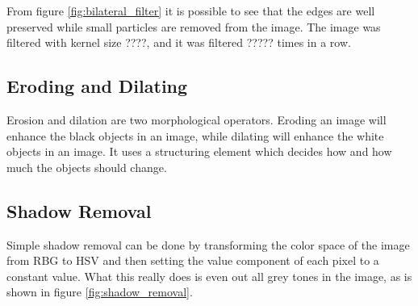 From figure \ref{fig:bilateral_filter} it is possible to see that the edges are well preserved while small particles are removed from the image. The image was filtered with kernel size {\color{red}????}, and it was filtered {\color{red}?????} times in a row.


\subsection{Eroding and Dilating}
Erosion and dilation are two morphological operators. Eroding an image will enhance the black objects in an image, while dilating will enhance the white objects in an image. It uses a structuring element which decides how and how much the objects should change. 


\subsection{Shadow Removal}
Simple shadow removal can be done by transforming the color space of the image from RBG to HSV and then setting the value component of each pixel to a constant value. What this really does is even out all grey tones in the image, as is shown in figure \ref{fig:shadow_removal}.

